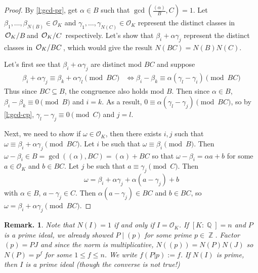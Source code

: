 \documentclass[11pt, a4paper]{memoir}
\DeclareMathOperator{\Q}{{\mathbb{Q}}}
\DeclareMathOperator{\Z}{{\mathbb{Z}}}
\theoremstyle{change}
\theoremstyle{plain}
\theoremstyle{nonumberplain}
\newtheorem{remark}{Remark.}
\newtheorem{proof}{Proof}
\newcommand{\quot}[2]{\mathchoice{\left.\raisebox{0.07em}{$#1$}\middle/\raisebox{-0.07em}{$#2$}\right.}
                                 {\left.\raisebox{0.03em}{$#1$}\middle/\raisebox{-0.03em}{$#2$}\right.}
                                 {\left.\raisebox{0.00em}{$#1$}\middle/\raisebox{-0.00em}{$#2$}\right.}
                                 {\left.\raisebox{0em}{$#1$}\middle/\raisebox{0em}{$#2$}\right.}}
\numberwithin{equation}{section}
\begin{document}
\begin{proof}
    By \cref{l:gcd-pr}, get $\alpha\in B$ such that $\gcd\left(\frac{(\alpha)}{B},C\right)=1$.
    Let $\beta_1,\ldots,\beta_{N(B)}\in\mathcal{O}_K$ and $\gamma_1,\ldots,\gamma_{N(C)}\in\mathcal{O}_K$ represent the distinct classes in $\quot{\mathcal{O}_K}{B}$and $\quot{\mathcal{O}_K}{C}$ respectively.
    Let's show that $\beta_i+\alpha\gamma_j$ represent the distinct classes in $\quot{\mathcal{O}_K}{BC}$, which would give the result $N(BC)=N(B)N(C)$.

    Let's first see that $\beta_i+\alpha\gamma_j$ are distinct mod $BC$ and suppose
    \begin{align*}
        \beta_i+\alpha\gamma_j \equiv\beta_k+\alpha\gamma_l\pmod{BC}&\iff \beta_i-\beta_k \equiv\alpha(\gamma_l-\gamma_i)\pmod{BC}
    \end{align*}
    Thus since $BC\subseteq B$, the congruence also holds mod $B$.
    Then since $\alpha\in B$, $\beta_i-\beta_k\equiv 0\pmod{B}$ and $i=k$.
    As a result, $0\equiv\alpha(\gamma_l-\gamma_j)\pmod{BC}$, so by \cref{l:gcd-cp}, $\gamma_l-\gamma_j\equiv 0\pmod{C}$ and $j=l$.

    Next, we need to show if $\omega\in\mathcal{O}_K$, then there exists $i,j$ such that $\omega\equiv\beta_i+\alpha\gamma_j\pmod{BC}$.
    Let $i$ be such that $\omega\equiv\beta_i\pmod{B}$.
    Then $\omega-\beta_i\in B=\gcd((\alpha),BC)=(\alpha)+BC$ so that $\omega-\beta_i=\alpha a+b$ for some $a\in\mathcal{O}_K$ and $b\in BC$.
    Let $j$ be such that $a\equiv\gamma_j\pmod{C}$.
    Then
    \begin{equation*}
        \omega=\beta_i+\alpha\gamma_j+\alpha(a-\gamma_j)+b
    \end{equation*}
    with $\alpha\in B$, $a-\gamma_j\in C$.
    Then $\alpha(a-\gamma_j)\in BC$ and $b\in BC$, so $\omega=\beta_i+\alpha\gamma_j\pmod{BC}$.
\end{proof}
\begin{remark}
    Note that $N(I)=1$ if and only if $I=\mathcal{O}_K$.
    If $[K:\Q]=n$ and $P$ is a prime ideal, we already showed $P\mid(p)$ for some prime $p\in\Z$.
    Factor $(p)=PJ$ and since the norm is multiplicative, $N((p))=N(P)N(J)$ so $N(P)=p^f$ for some $1\leq f\leq n$.
    We write $f(P|p):=f$.
    If $N(I)$ is prime, then $I$ is a prime ideal (though the converse is not true!)
\end{remark}
\end{document}
